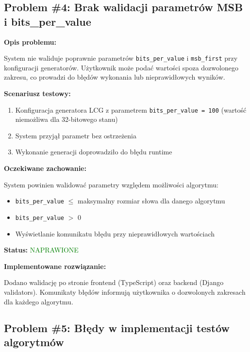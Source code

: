 \documentclass[12pt,a4paper]{article}
\begin{document}
\subsection{Problem \#4: Brak walidacji parametrów MSB i bits\_per\_value}

\begin{tcolorbox}[colback=orange!10!white,colframe=orange!75!black,title=Błąd walidacji - Priorytet: KRYTYCZNY]
\textbf{Opis problemu:}

System nie waliduje poprawnie parametrów \texttt{bits\_per\_value} i \texttt{msb\_first} przy konfiguracji generatorów. Użytkownik może podać wartości spoza dozwolonego zakresu, co prowadzi do błędów wykonania lub nieprawidłowych wyników.

\textbf{Scenariusz testowy:}
\begin{enumerate}
    \item Konfiguracja generatora LCG z parametrem \texttt{bits\_per\_value = 100} (wartość niemożliwa dla 32-bitowego stanu)
    \item System przyjął parametr bez ostrzeżenia
    \item Wykonanie generacji doprowadziło do błędu runtime
\end{enumerate}

\textbf{Oczekiwane zachowanie:}

System powinien walidować parametry względem możliwości algorytmu:
\begin{itemize}
    \item \texttt{bits\_per\_value} $\leq$ maksymalny rozmiar słowa dla danego algorytmu
    \item \texttt{bits\_per\_value} $>$ 0
    \item Wyświetlanie komunikatu błędu przy nieprawidłowych wartościach
\end{itemize}

\textbf{Status:} \textcolor{green}{NAPRAWIONE}

\textbf{Implementowane rozwiązanie:}

Dodano walidację po stronie frontend (TypeScript) oraz backend (Django validators). Komunikaty błędów informują użytkownika o dozwolonych zakresach dla każdego algorytmu.
\end{tcolorbox}

\subsection{Problem \#5: Błędy w implementacji testów algorytmów}
\end{document}
